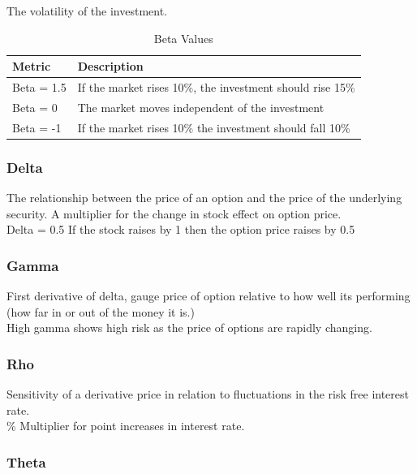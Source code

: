 \documentclass[11pt]{scrartcl} %
\begin{document}
The volatility of the investment.

\begin{table}[h] %
	\centering %
	\begin{tabular}{l l}
		\toprule
		\textbf{Metric} & \textbf{Description} \\
		\midrule
		Beta = 1.5 & If the market rises 10\%, the investment should rise 15\% \\
		Beta = 0 & The market moves independent of the investment \\
		Beta = -1 & If the market rises 10\% the investment should fall 10\%\\ 
		\bottomrule
	\end{tabular}
	\caption{Beta Values}
\end{table}

\subsubsection{Delta}

The relationship between the price of an option and the price of the underlying security. A multiplier for the change in stock effect on option price.\\

Delta = 0.5 If the stock raises by 1 then the option price raises by 0.5 

\subsubsection{Gamma}

First derivative of delta, gauge price of option relative to how well its performing (how far in or out of the money it is.)\\

High gamma shows high risk as the price of options are rapidly changing.

\subsubsection{Rho}

Sensitivity of a derivative price in relation to fluctuations in the risk free interest rate.\\

\% Multiplier for point increases in interest rate.

\subsubsection{Theta}
\end{document}
